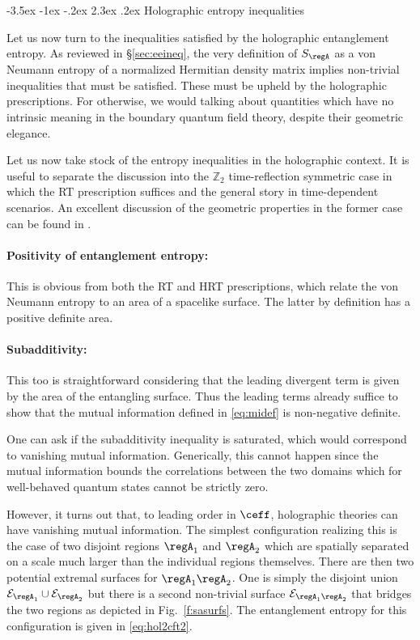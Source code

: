 \documentclass[12pt,openany]{book}
\makeatletter
\renewcommand\section{\@startsection {section}{1}{\z@}%
                                   {-3.5ex \@plus -1ex \@minus -.2ex}%
                                   {2.3ex \@plus.2ex}%
                                   {\normalfont\large\bfseries}}
\makeatother
\begin{document}
\section{Holographic entropy inequalities}
\label{sec:heeineq}

Let us now turn to the inequalities satisfied by the holographic entanglement entropy. As reviewed in \S\ref{sec:eeineq}, the very definition of $S_\regA$ as a von Neumann entropy of a normalized Hermitian density matrix implies non-trivial inequalities that must be satisfied. These must be upheld by the holographic prescriptions. For otherwise, we would talking about quantities which have no intrinsic meaning in the boundary quantum field theory, despite their geometric elegance.

Let us now take stock of the entropy inequalities in the holographic context. It is useful to separate the discussion into the ${\mathbb Z}_2$ time-reflection symmetric case in which the RT prescription suffices and the general story in time-dependent scenarios. An excellent discussion of the geometric properties in the former case can be found in \cite{Headrick:2013zda}.

\paragraph{Positivity of entanglement entropy:} This is obvious from both the RT and HRT prescriptions, which relate the von Neumann entropy to an area of a spacelike surface. The latter by definition has a positive definite area.

\paragraph{Subadditivity:} This too is straightforward considering that the leading divergent term is given by the area of the entangling surface. Thus  the leading terms already suffice to show that the mutual information defined in \eqref{eq:midef} is non-negative definite.

One can ask if the subadditivity inequality is saturated, which would correspond to vanishing mutual information. Generically, this cannot happen since the mutual information bounds the correlations between the two domains which for well-behaved quantum states cannot be strictly zero.

However, it turns out that, to leading order in $\ceff$, holographic theories can have vanishing mutual information. The simplest configuration realizing this is the case of two disjoint regions $\regA_1$ and $\regA_2$ which are spatially separated on a scale much larger than the individual regions themselves. There are then two potential extremal surfaces for $\regA_1 \regA_2$. One is simply the disjoint union ${\cal E}_{\regA_1} \cup {\cal E}_{\regA_2}$ but there is a second non-trivial surface ${\cal E}_{\regA_1 \regA_2}$ that bridges the two regions as depicted in Fig.~\ref{f:sasurfs}. The entanglement entropy for this configuration is given in  \eqref{eq:hol2cft2}.
\end{document}
